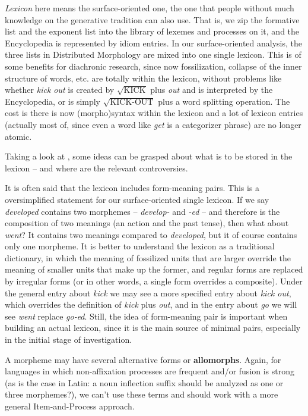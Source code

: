 \documentclass[UTF8, a4paper, oneside, scheme=plain]{ctexart}
\newcommand*{\concept}[1]{\textbf{#1}}
\newcommand*{\term}[1]{\emph{#1}}
\newcommand*{\corpus}[1]{\emph{#1}}
\begin{document}
\term{Lexicon} here means the surface-oriented one,
the one that people without much knowledge on the generative tradition can also use.
That is, we zip the formative list and the exponent list into 
the library of lexemes and processes on it,
and the Encyclopedia is represented by idiom entries.
In our surface-oriented analysis,
the three lists in Distributed Morphology are mixed into one single lexicon.
This is of some benefits for diachronic research,
since now fossilization, collapse of the inner structure of words, etc. 
are totally within the lexicon,
without problems like whether 
\corpus{kick out} is created by $\sqrt{\text{KICK}}$ plus \corpus{out}
and is interpreted by the Encyclopedia,
or is simply $\sqrt{\text{KICK-OUT}}$ plus a word splitting operation.
The cost is there is now (morpho)syntax within the lexicon
and a lot of lexicon entries 
(actually most of, since even a word like \corpus{get} is a categorizer phrase)
are no longer atomic.

Taking a look at ,
some ideas can be grasped about what is to be stored in the lexicon
-- and where are the relevant controversies.


It is often said that the lexicon includes form-meaning pairs.
This is a oversimplified statement
for our surface-oriented single lexicon.
If we say \corpus{developed} contains two morphemes -- 
\corpus{develop-} and \corpus{-ed} --
and therefore is the composition of two meanings 
(an action and the past tense),
then what about \corpus{went}?
It contains two meanings compared to \corpus{developed},
but it of course contains only one morpheme.
It is better to understand the lexicon as a traditional dictionary,
in which the meaning of fossilized units that are larger 
override the meaning of smaller units that make up the former,
and regular forms are replaced by irregular forms
(or in other words,
a single form overrides a composite).
Under the general entry about \corpus{kick}
we may see a more specified entry about \corpus{kick out},
which overrides the definition of \corpus{kick} plus \corpus{out},
and in the entry about \corpus{go} we will see \corpus{went} replace \corpus{go-ed}.
Still, the idea of form-meaning pair is important when building an actual lexicon,
since it is the main source of minimal pairs,
especially in the initial stage of investigation.

A morpheme may have several alternative forms or \concept{allomorphs}. 
Again, for languages in which non-affixation processes are frequent and/or fusion is strong 
(as is the case in Latin: a noun inflection suffix should be analyzed as one or three morphemes?), 
we can't use these terms and should work with a more general Item-and-Process approach.
\end{document}
